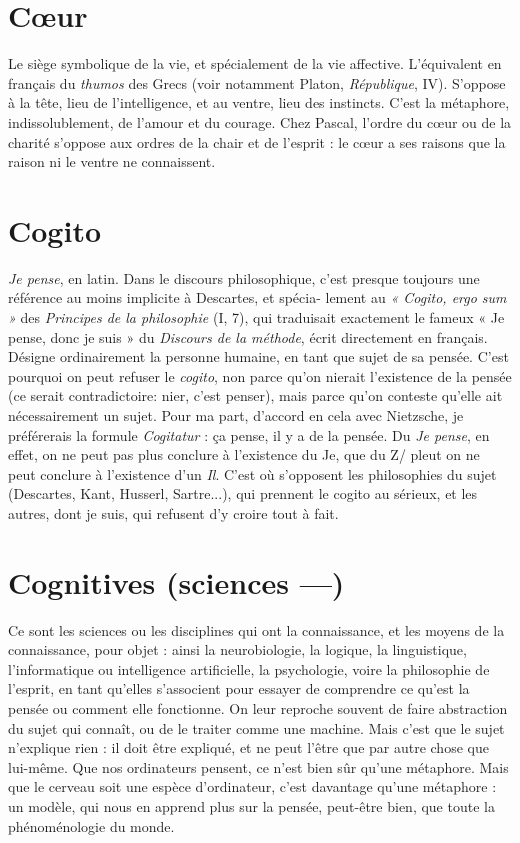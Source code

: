 \section{C{\oe}ur}
Le siège symbolique de la vie, et spécialement de la vie affective.
L’équivalent en français du {\it thumos} des Grecs (voir notamment
Platon, {\it République}, IV). S’oppose à la tête, lieu de l’intelligence, et au ventre,
lieu des instincts. C’est la métaphore, indissolublement, de l’amour et du courage.
Chez Pascal, l’ordre du cœur ou de la charité s'oppose aux ordres de la chair
et de l'esprit : le cœur a ses raisons que la raison ni le ventre ne connaissent.

\section{Cogito}
{\it Je pense}, en latin. Dans le discours philosophique, c’est presque
toujours une référence au moins implicite à Descartes, et spécia-
lement au {\it « Cogito, ergo sum »} des {\it Principes de la philosophie} (I, 7), qui traduisait
exactement le fameux « Je pense, donc je suis » du {\it Discours de la méthode},
écrit directement en français. Désigne ordinairement la personne humaine, en
tant que sujet de sa pensée. C’est pourquoi on peut refuser le {\it cogito}, non parce
qu’on nierait l’existence de la pensée (ce serait contradictoire: nier, c’est
penser), mais parce qu’on conteste qu’elle ait nécessairement un sujet. Pour ma
part, d’accord en cela avec Nietzsche, je préférerais la formule {\it Cogitatur} : ça
pense, il y a de la pensée. Du {\it Je pense}, en effet, on ne peut pas plus conclure à
l'existence du Je, que du Z/ pleut on ne peut conclure à l’existence d’un {\it Il}. C’est
où s'opposent les philosophies du sujet (Descartes, Kant, Husserl, Sartre...),
qui prennent le cogito au sérieux, et les autres, dont je suis, qui refusent d’y
croire tout à fait.

\section{Cognitives (sciences —)}
Ce sont les sciences ou les disciplines qui
ont la connaissance, et les moyens de la
connaissance, pour objet : ainsi la neurobiologie, la logique, la linguistique,
l'informatique ou intelligence artificielle, la psychologie, voire la philosophie de
l'esprit, en tant qu’elles s'associent pour essayer de comprendre ce qu'est la
pensée ou comment elle fonctionne. On leur reproche souvent de faire abstraction
du sujet qui connaît, ou de le traiter comme une machine. Mais c’est que
le sujet n’explique rien : il doit être expliqué, et ne peut l’être que par autre
chose que lui-même. Que nos ordinateurs pensent, ce n’est bien sûr qu’une
métaphore. Mais que le cerveau soit une espèce d’ordinateur, c’est davantage
qu’une métaphore : un modèle, qui nous en apprend plus sur la pensée, peut-être
bien, que toute la phénoménologie du monde.

